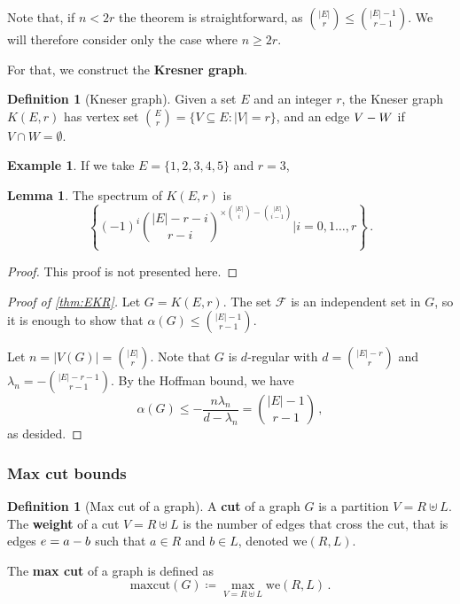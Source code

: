 \documentclass[12pt]{amsart}
\theoremstyle{definition}
\newtheorem{lm}[thm]{Lemma}
\newtheorem{defin}[thm]{Definition}
\newtheorem{smpl}[thm]{Example}
\newcommand{\FF}{\mathcal F}
\newcommand{\maxcut}{\mathrm{maxcut}}
\newcommand{\we}{\mathrm{we}}
\begin{document}
Note that, if $n < 2r$ the theorem is straightforward, as $\binom{|E|}{r} \leq \binom{|E|-1}{r-1}$.
We will therefore consider only the case where $n \geq 2r$.

For that, we construct the \textbf{Kresner graph}.

\begin{defin}[Kneser graph]
Given a set $E$ and an integer $r$, the Kneser graph $K(E, r)$ has vertex set $\binom{E}{r} = \{ V \subseteq E : |V| = r\}$, and an edge $V \-- W$ if $V \cap W = \emptyset$.
\end{defin}

\begin{smpl}
If we take $E = \{1, 2, 3, 4, 5\}$ and $r = 3$, 
\end{smpl}

\begin{lm}
The spectrum of $K(E, r)$ is 
$$ \left\{(-1)^i\binom{|E| -r - i}{r - i}^{\times \binom{|E|}{i} - \binom{|E|}{i-1}} \Big| i = 0, 1 \ldots , r \right\} \, . $$
\end{lm}

\begin{proof}
This proof is not presented here.
\end{proof}

\begin{proof}[Proof of \cref{thm:EKR}]
Let $G = K(E, r)$.
The set $\FF$ is an independent set in $G$, so it is enough to show that $\alpha(G) \leq \binom{|E|-1}{r-1}$.

Let $n = |V(G)| = \binom{|E|}{r}$.
Note that  $G$ is $d$-regular with $d = \binom{|E|-r}{r}$ and $\lambda_n = -\binom{|E| -r -1 }{r - 1}$.
By the Hoffman bound, we have
$$ \alpha(G) \leq -\frac{n\lambda_n}{d - \lambda_n} = \binom{|E|-1}{r-1} \, ,$$
as desided.
\end{proof}


\subsubsection*{Max cut bounds}



\begin{defin}[Max cut of a graph]
A \textbf{cut} of a graph $G$ is a partition $V = R \uplus L$.
The \textbf{weight} of a cut $V = R \uplus L$ is the number of edges that cross the cut, that is edges $e = a \-- b$ such that $a \in R$ and $b \in L$, denoted $\we(R, L)$.

The \textbf{max cut} of a graph is defined as
$$ \maxcut (G) \coloneqq \max_{V = R \uplus L} \we(R, L) \, . $$
\end{defin}
\end{document}

